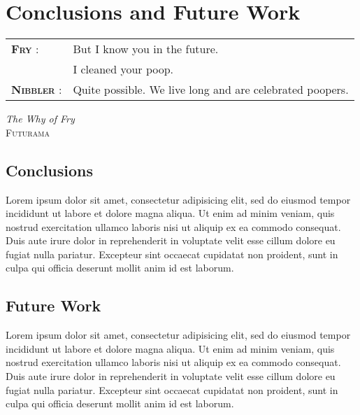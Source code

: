 \chapter{Conclusions and Future Work} %
\label{cha:conclusions}

\setlength{\epigraphwidth}{8cm}
\renewcommand{\tabcolsep}{0em}

\epigraph{
  \begin{tabular}{p{1.75cm}p{6cm}}
    \footnotesize{\textbf{\textsc{Fry}} :}
      & But I know you in the future.\\
      & I cleaned your poop. \\
    \footnotesize{\textbf{\textsc{Nibbler}} :}
      & Quite possible. We live long and are celebrated poopers. \\
  \end{tabular}
  \vspace{1em}
}{\textit{The Why of Fry}\\ \textsc{Futurama}}

\newpage

\section{Conclusions} %
\label{sec:conclusions}

Lorem ipsum dolor sit amet, consectetur adipisicing elit, sed do eiusmod tempor incididunt ut labore et dolore magna aliqua. Ut enim ad minim veniam, quis nostrud exercitation ullamco laboris nisi ut aliquip ex ea commodo consequat. Duis aute irure dolor in reprehenderit in voluptate velit esse cillum dolore eu fugiat nulla pariatur. Excepteur sint occaecat cupidatat non proident, sunt in culpa qui officia deserunt mollit anim id est laborum.


\section{Future Work} %
\label{sec:future}

Lorem ipsum dolor sit amet, consectetur adipisicing elit, sed do eiusmod tempor incididunt ut labore et dolore magna aliqua. Ut enim ad minim veniam, quis nostrud exercitation ullamco laboris nisi ut aliquip ex ea commodo consequat. Duis aute irure dolor in reprehenderit in voluptate velit esse cillum dolore eu fugiat nulla pariatur. Excepteur sint occaecat cupidatat non proident, sunt in culpa qui officia deserunt mollit anim id est laborum.



